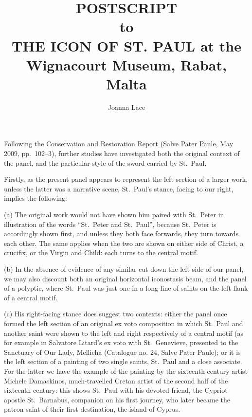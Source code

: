 \documentclass[a4paper,12pt]{article}
\begin{document}
\title{POSTSCRIPT\\\normalsize to\\THE ICON OF ST. PAUL at the Wignacourt Museum, Rabat,
  Malta} 
\author{Joanna Lace} 
\date{}%
\maketitle 

Following the Conservation and Restoration Report (Salve Pater Paule,
May 2009, pp.~102--3), further studies have investigated both the
original context of the panel, and the particular style of the sword
carried by St.~Paul.

Firstly, as the present panel appears to represent the left section of
a larger work, unless the latter was a narrative scene, St.~Paul's
stance, facing to our right, implies the following:

(a) The original work would not have shown him paired with St.~Peter
in illustration of the words ``St.~Peter and St.~Paul'', because
St.~Peter is accordingly shown first, and unless they both face
forwards, they turn towards each other.  The same applies when the two
are shown on either side of Christ, a crucifix, or the Virgin and
Child: each turns to the central motif.

(b) In the absence of evidence of any similar cut down the left side
of our panel, we may also discount both an original horizontal
iconostasis beam, and the panel of a polyptic, where St.~Paul was just
one in a long line of saints on the left flank of a central motif.

(c) His right-facing stance does suggest two contexts: either the
panel once formed the left section of an original ex voto composition
in which St.~Paul and another saint were shown to the left and right
respectively of a central motif (as for example in Salvatore Litard's
ex voto with St.~Genevieve, presented to the Sanctuary of Our Lady,
Mellieha (Catalogue no. 24, Salve Pater Paule); or it is the left
section of a painting of two single saints, St.~Paul and a close
associate.  For the latter we have the example of the painting by the
sixteenth century artist Michele Damaskinos, much-travelled Cretan
artist of the second half of the sixteenth century: this shows
St.~Paul with his devoted friend, the Cypriot apostle St.~Barnabus,
companion on his first journey, who later became the patron saint of
their first destination, the island of Cyprus.
\end{document}
